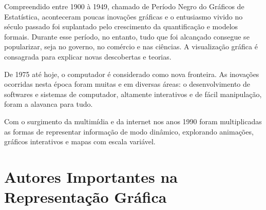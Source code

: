 \inic Compreendido entre 1900 à 1949, chamado de Período Negro do Gráficos de Estatística, aconteceram poucas inovações gráficas e o entusiasmo vivido no século passado foi suplantado pelo crescimento da quantificação e modelos formais. Durante esse período, no entanto, tudo que foi alcançado consegue se popularizar, seja no governo, no comércio e nas ciências. A visualização gráfica é consagrada para explicar novas descobertas e teorias.
\vskip0.3cm 


\inic De 1975 até hoje, o computador é considerado como nova fronteira. As inovações ocorridas nesta época foram muitas e em diversas áreas: o desenvolvimento de softwares e sistemas de computador,
altamente interativos e de fácil manipulação, foram a alavanca para tudo.\vskip0.3cm  


\inic Com o surgimento da multimídia e da internet nos anos
1990 foram multiplicadas as formas de representar informação de modo dinâmico,
explorando animações, gráficos interativos e mapas com escala variável.







\section{Autores Importantes na Representação Gráfica}

